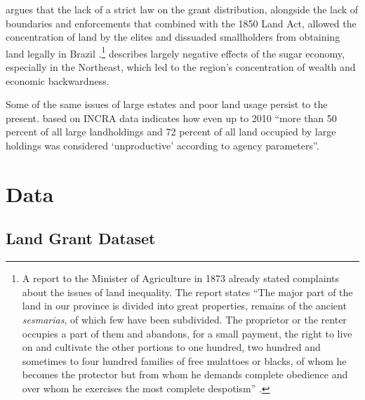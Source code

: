 \documentclass[11pt]{article}
\newcommand{\red}[1]{\textcolor{red}{#1}}
\begin{document}
\textcite{Da_Cruz2023-gg} argues that the lack of a strict law on the grant distribution, alongside the lack of boundaries and enforcements that combined with the 1850 Land Act, allowed the concentration of land by the elites and dissuaded smallholders from obtaining land legally in Brazil .\footnote{A report to the Minister of Agriculture in 1873 already stated complaints about the issues of land inequality. The report states ``The major part of the land in our province is divided into great properties, remains of the ancient \textit{sesmarias}, of which few have been subdivided. The proprietor or the renter occupies a part of them and abandons, for a small payment, the right to live on and cultivate the other portions to one hundred, two hundred and sometimes to four hundred families of free mulattoes or blacks, of whom he becomes the protector but from whom he demands complete obedience and over whom he exercises the most complete despotism'' \parencite[p.~325]{Smith1972-dv}.}
\textcite[p.~16]{Baer2014-gh} describes largely negative effects of the sugar economy, especially in the Northeast, which led to the region's concentration of wealth and economic backwardness.

Some of the same issues of large estates and poor land usage persist to the present. \textcite{Carlson2019-mk} based on INCRA data indicates how even up to 2010 ``more than 50 percent of all large landholdings and 72 percent of all land occupied by large holdings was considered `unproductive' according to agency parameters''.




\section{Data}
\label{sec:data}

\subsection{Land Grant Dataset}
\end{document}
